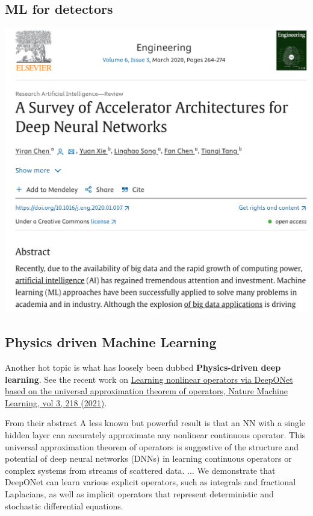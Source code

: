 \documentclass[%
oneside,                 %
final,                   %
10pt]{article}
\begin{document}
\subsection{ML for detectors}

\vspace{6mm}

\centerline{\includegraphics[width=1.0\linewidth]{figures/detectors.png}}

\vspace{6mm}

\subsection{Physics driven Machine Learning}

Another hot topic is what has loosely been dubbed \textbf{Physics-driven deep learning}. See the recent work on \href{{https://www.nature.com/articles/s42256-021-00302-5}}{Learning nonlinear operators via DeepONet based on the universal approximation theorem of operators, Nature Machine Learning, vol 3, 218 (2021)}.

\begin{block}{From their abstract }
A less known but powerful result is that an NN with a single hidden layer can accurately approximate any nonlinear continuous operator. This universal approximation theorem of operators is suggestive of the structure and potential of deep neural networks (DNNs) in learning continuous operators or complex systems from streams of scattered data. ...  We demonstrate that DeepONet can learn various explicit operators, such as integrals and fractional Laplacians, as well as implicit operators that represent deterministic and stochastic differential equations. 
\end{block}
\end{document}
